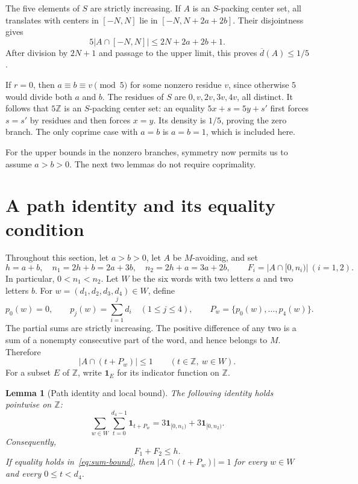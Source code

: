 \documentclass[11pt]{article}
\newtheorem{lemma}[theorem]{Lemma}
\theoremstyle{remark}
\newcommand{\Z}{\mathbb Z}
\newcommand{\ind}{\mathbf 1}
\newcommand{\ud}{\overline d}
\begin{document}
The five elements of \(S\) are strictly increasing. If \(A\) is an
\(S\)-packing center set, all translates with centers in \([-N,N]\)
lie in \([-N,N+2a+2b]\). Their disjointness gives
\begin{equation}\label{eq:volume}
 5|A\cap[-N,N]|\le2N+2a+2b+1.
\end{equation}
After division by \(2N+1\) and passage to the upper limit, this proves
\(\ud(A)\le1/5\).

If \(r=0\), then \(a\equiv b\equiv v\pmod5\) for some nonzero
residue \(v\), since otherwise \(5\) would divide both \(a\) and
\(b\). The residues of \(S\) are \(0,v,2v,3v,4v\), all distinct.
It follows that \(5\Z\) is an \(S\)-packing center set: an equality
\(5x+s=5y+s'\) first forces \(s=s'\) by residues and then forces
\(x=y\). Its density is \(1/5\), proving the zero branch. The only
coprime case with \(a=b\) is \(a=b=1\), which is included here.

For the upper bounds in the nonzero branches, symmetry now permits us
to assume \(a>b>0\). The next two lemmas do not require coprimality.

\section{A path identity and its equality condition}

Throughout this section, let \(a>b>0\), let \(A\) be \(M\)-avoiding,
and set
\begin{equation}\label{eq:windows}
 h=a+b,\quad n_1=2h+b=2a+3b,\quad n_2=2h+a=3a+2b,
 \qquad F_i=|A\cap[0,n_i)|\ (i=1,2).
\end{equation}
In particular, \(0<n_1<n_2\). Let \(W\) be the six words with two
letters \(a\) and two letters \(b\). For
\(w=(d_1,d_2,d_3,d_4)\in W\), define
\[
 p_0(w)=0,\qquad p_j(w)=\sum_{i=1}^j d_i\quad(1\le j\le4),
 \qquad P_w=\{p_0(w),\ldots,p_4(w)\}.
\]
The partial sums are strictly increasing. The positive difference of
any two is a sum of a nonempty consecutive part of the word, and hence
belongs to \(M\). Therefore
\begin{equation}\label{eq:path-clique}
 |A\cap(t+P_w)|\le1\qquad(t\in\Z,\ w\in W).
\end{equation}
For a subset \(E\) of \(\Z\), write \(\ind_E\) for its indicator
function on \(\Z\).

\begin{lemma}[Path identity and local bound]\label{lem:path}
The following identity holds pointwise on \(\Z\):
\begin{equation}\label{eq:path-identity}
 \sum_{w\in W}\sum_{t=0}^{d_4-1}\ind_{t+P_w}
 =3\ind_{[0,n_1)}+3\ind_{[0,n_2)}.
\end{equation}
Consequently,
\begin{equation}\label{eq:sum-bound}
 F_1+F_2\le h.
\end{equation}
If equality holds in~\eqref{eq:sum-bound}, then
\(|A\cap(t+P_w)|=1\) for every \(w\in W\) and every
\(0\le t<d_4\).
\end{lemma}
\end{document}
